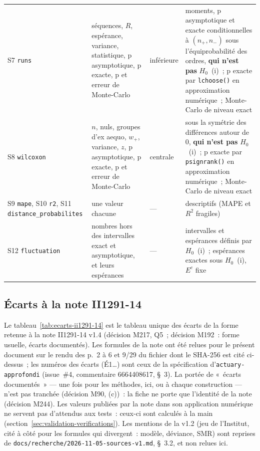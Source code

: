 \documentclass[a4paper,11pt]{article}
\newcommand{\code}[1]{\texttt{\small #1}}
\begin{document}
{\begin{longtable}{@{}p{2.6cm}p{5.0cm}p{2.0cm}p{5.0cm}@{}}
S7 \code{runs} & séquences, $R$, espérance, variance, statistique, p asymptotique, p exacte, p et erreur de Monte-Carlo & inférieure & moments, p asymptotique et exacte conditionnelles à $(n_{+}, n_{-})$ sous l'équiprobabilité des ordres, \textbf{qui n'est pas} $H_0$~(i)~; p exacte par \code{lchoose()} en approximation numérique~; Monte-Carlo de niveau exact \\
S8 \code{wilcoxon} & $n$, nuls, groupes d'ex aequo, $w_{+}$, variance, $z$, p asymptotique, p exacte, p et erreur de Monte-Carlo & centrale & sous la symétrie des différences autour de 0, \textbf{qui n'est pas} $H_0$~(i)~; p exacte par \code{psignrank()} en approximation numérique~; Monte-Carlo de niveau exact \\
S9 \code{mape}, S10 \code{r2}, S11 \code{distance\_}\allowbreak\code{probabilites} & une valeur chacune & --- & descriptifs (MAPE et $R^2$ fragiles) \\
S12 \code{fluctuation} & nombres hors des intervalles exact et asymptotique, et leurs espérances & --- & intervalles et espérances définis par $H_0$~(i)~; espérances exactes sous $H_0$~(i), $E^c$ fixe \\
\end{longtable}
}

\subsection{Écarts à la note II1291-14}
\label{sec:validation-ecarts}

Le tableau~\ref{tab:ecarts-ii1291-14} est le tableau unique des écarts de
la forme retenue à la note II1291-14 v1.4 (décision M217, Q5~; décision
M192~: forme usuelle, écarts documentés). Les formules de la note ont été
relues pour le présent document sur le rendu des p.~2 à 6 et 9/29 du
fichier dont le SHA-256 est cité ci-dessus~; les numéros des écarts
(É1\ldots) sont ceux de la spécification d'\code{actuary-approfondi}
(issue~\#4, commentaire 6664408617, §~3). La portée de «~écarts
documentés~» --- une fois pour les méthodes, ici, ou à chaque construction
--- n'est pas tranchée (décision M90, (c))~: la fiche ne porte que
l'identité de la note (décision M244). Les valeurs publiées par la note
dans son application numérique ne servent pas d'attendus aux tests~: ceux-ci
sont calculés à la main (section~\ref{sec:validation-verifications}).
Les mentions de la v1.2 (jeu de l'Institut, cité à côté pour les formules
qui divergent~: modèle, déviance, SMR) sont reprises de
\code{docs/recherche/}\allowbreak\code{2026-11-05-sources-v1.md}, §~3.2,
et non relues ici.
\end{document}
